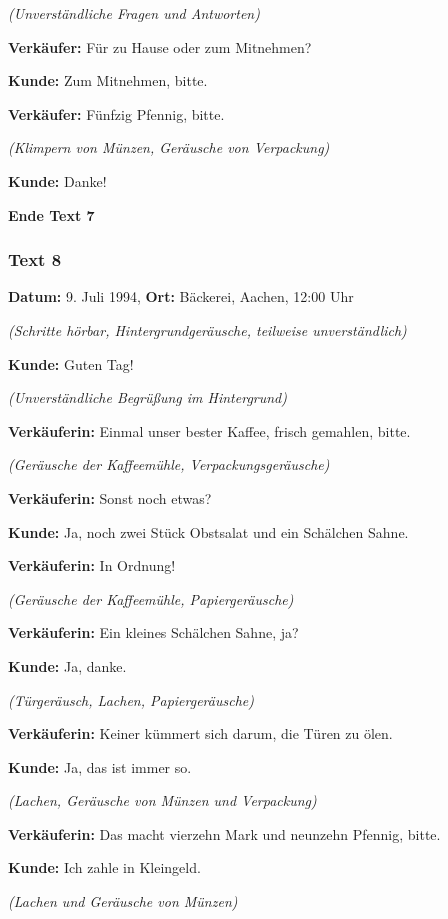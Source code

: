 \documentclass[
]{article}
\begin{document}
\emph{(Unverständliche Fragen und Antworten)}

\textbf{Verkäufer:} Für zu Hause oder zum Mitnehmen?

\textbf{Kunde:} Zum Mitnehmen, bitte.

\textbf{Verkäufer:} Fünfzig Pfennig, bitte.

\emph{(Klimpern von Münzen, Geräusche von Verpackung)}

\textbf{Kunde:} Danke!

\textbf{Ende Text 7}

\subsubsection{\texorpdfstring{\textbf{Text 8}}{Text 8}}\label{text-8}

\textbf{Datum:} 9. Juli 1994, \textbf{Ort:} Bäckerei, Aachen, 12:00 Uhr

\emph{(Schritte hörbar, Hintergrundgeräusche, teilweise unverständlich)}

\textbf{Kunde:} Guten Tag!

\emph{(Unverständliche Begrüßung im Hintergrund)}

\textbf{Verkäuferin:} Einmal unser bester Kaffee, frisch gemahlen,
bitte.

\emph{(Geräusche der Kaffeemühle, Verpackungsgeräusche)}

\textbf{Verkäuferin:} Sonst noch etwas?

\textbf{Kunde:} Ja, noch zwei Stück Obstsalat und ein Schälchen Sahne.

\textbf{Verkäuferin:} In Ordnung!

\emph{(Geräusche der Kaffeemühle, Papiergeräusche)}

\textbf{Verkäuferin:} Ein kleines Schälchen Sahne, ja?

\textbf{Kunde:} Ja, danke.

\emph{(Türgeräusch, Lachen, Papiergeräusche)}

\textbf{Verkäuferin:} Keiner kümmert sich darum, die Türen zu ölen.

\textbf{Kunde:} Ja, das ist immer so.

\emph{(Lachen, Geräusche von Münzen und Verpackung)}

\textbf{Verkäuferin:} Das macht vierzehn Mark und neunzehn Pfennig,
bitte.

\textbf{Kunde:} Ich zahle in Kleingeld.

\emph{(Lachen und Geräusche von Münzen)}
\end{document}
